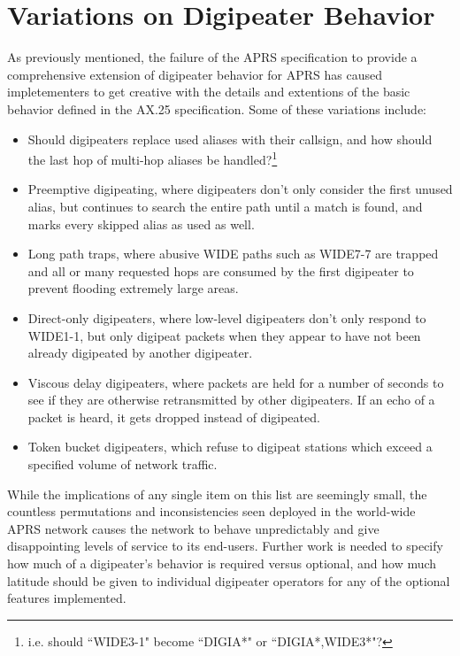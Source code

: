 \section{Variations on Digipeater Behavior}

As previously mentioned, the failure of the APRS specification to provide
a comprehensive extension of digipeater behavior for APRS has caused
impletementers to get creative with the details and extentions of
the basic behavior defined in the AX.25 specification.
Some of these variations include:
\begin{itemize}
	\item Should digipeaters replace used aliases with their callsign, and
		how should the last hop of multi-hop aliases be handled?\footnote{i.e.
		should ``WIDE3-1" become ``DIGIA*" or ``DIGIA*,WIDE3*"?}
	\item Preemptive digipeating, where digipeaters don't only consider the
		first unused alias, but continues to search the entire path
		until a match is found, and marks every skipped alias as used as well.
	\item Long path traps, where abusive WIDE paths such as WIDE7-7 are trapped
		and all or many requested hops are consumed by the first digipeater
		to prevent flooding extremely large areas.
	\item Direct-only digipeaters, where low-level digipeaters don't only respond
		to WIDE1-1, but only digipeat packets when they appear to have not
		been already digipeated by another digipeater.
	\item Viscous delay digipeaters, where packets are held for a number of
		seconds to see if they are otherwise retransmitted by other digipeaters.
		If an echo of a packet is heard, it gets dropped instead of digipeated.
	\item Token bucket digipeaters, which refuse to digipeat stations which
		exceed a specified volume of network traffic.
\end{itemize}

While the implications of any single item on this list are seemingly small,
the countless permutations and inconsistencies seen deployed in the
world-wide APRS network causes the network to behave unpredictably and
give disappointing levels of service to its end-users.
Further work is needed to specify how much of a digipeater's behavior is
required versus optional, and how much latitude should be given to individual
digipeater operators for any of the optional features implemented.

